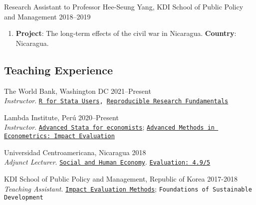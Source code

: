 \documentclass[a4paper, 10pt]{article}
\renewenvironment{itemize}{
  \begin{list}{}
    { \setlength{\itemsep}{5pt}
      \setlength{\parsep}{0pt}
      \setlength{\topsep}{0pt}
      \setlength{\leftmargin}{0em} } }{
  \end{list}}
\begin{document}
\begin{itemize}
\begin{enumerate}[leftmargin=10pt, label={}, nosep]
  \end{enumerate}
  \item Research Assistant to Professor Hee-Seung Yang, KDI School of Public Policy and Management \hfill 2018--2019  
  \begin{enumerate}[leftmargin=10pt, label={}, nosep]  
    \item {\small \textbf{Project}: The long-term effects of the civil war in Nicaragua. \newline \textbf{Country}: Nicaragua.}
  \end{enumerate}
\end{itemize}

\subsection*{Teaching Experience}
\begin{itemize}
  \item The World Bank, Washington DC \hfill 2021--Present \\  {\small \emph{Instructor}.} \texttt{\href{https://github.com/worldbank/dime-r-training}{R for Stata Users}, \href{https://github.com/dime-worldbank/rrf-course}{\texttt{Reproducible Research Fundamentals}}}

  \item Lambda Institute, Perú \hfill 2020--Present \\ {\small \emph{Instructor}.} \texttt{\href{https://github.com/lambda-stata/course-materials}{Advanced Stata for economists}}; \href{https://github.com/lambda-stata/econometria-avanzada}{\texttt{Advanced Methods in Econometrics: Impact Evaluation}}
 
  \item Universidad Centroamericana, Nicaragua \hfill 2018 \\ {\small \emph{Adjunct Lecturer}.} \texttt{\href{https://github.com/econsoc-uca}{Social and Human Economy}}. \texttt{\href{https://rrmaximiliano.github.io/docs/evaluation-esh.pdf}{Evaluation: 4.9/5}}
  
  \item KDI School of Public Policy and Management, Republic of Korea \hfill
  2017-2018 \\ {\small \emph{Teaching Assistant}.}
  \texttt{\href{https://www.dropbox.com/home/teaching_materials/kdischool/spring_2018_impact_evaluation}{Impact
  Evaluation Methods}}; \texttt{\textcolor{webbrown}{Foundations of Sustainable
  Development}}
\end{itemize}
\end{document}
